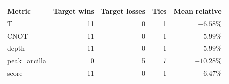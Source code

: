 \begin{tabular}{lrrrr}
\toprule
Metric & Target wins & Target losses & Ties & Mean relative \\
\midrule
T & 11 & 0 & 1 & $-6.58\%$ \\
CNOT & 11 & 0 & 1 & $-5.99\%$ \\
depth & 11 & 0 & 1 & $-5.99\%$ \\
peak_ancilla & 0 & 5 & 7 & $+10.28\%$ \\
score & 11 & 0 & 1 & $-6.47\%$ \\
\bottomrule
\end{tabular}
